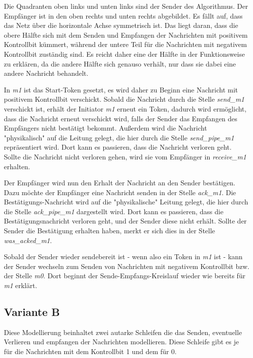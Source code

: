 \documentclass[]{scrartcl}
\begin{document}
Die Quadranten oben links und unten links sind der Sender des Algorithmus. Der Empfänger ist in den oben rechts und unten rechts abgebildet. Es fällt auf, dass das Netz über die horizontale Achse symmetrisch ist. Das liegt daran, dass die obere Hälfte sich mit dem Senden und Empfangen der Nachrichten mit positivem Kontrollbit kümmert, während der untere Teil für die Nachrichten mit negativem Kontrollbit zuständig sind. Es reicht daher eine der Hälfte in der Funktionsweise zu erklären, da die andere Hälfte sich genauso verhält, nur dass sie dabei eine andere Nachricht behandelt.

In \textit{m1} ist das Start-Token gesetzt, es wird daher zu Beginn eine Nachricht mit positivem Kontrollbit verschickt. Sobald die Nachricht durch die Stelle \textit{send\_m1} verschickt ist, erhält der Initiator \textit{m1} erneut ein Token, dadurch wird ermöglicht, dass die Nachricht erneut verschickt wird, falls der Sender das Empfangen des Empfängers nicht bestätigt bekommt. Außerdem wird die Nachricht "physikalisch" auf die Leitung gelegt, die hier durch die Stelle \textit{send\_pipe\_m1} repräsentiert wird. Dort kann es passieren, dass die Nachricht verloren geht. Sollte die Nachricht nicht verloren gehen, wird sie vom Empfänger in \textit{receive\_m1} erhalten.

Der Empfänger wird nun den Erhalt der Nachricht an den Sender bestätigen. Dazu möchte der Empfänger eine Nachricht senden in der Stelle \textit{ack\_m1}. Die Bestätigungs-Nachricht wird auf die "physikalische" Leitung gelegt, die hier durch die Stelle \textit{ack\_pipe\_m1} dargestellt wird. Dort kann es passieren, dass die Bestätigungsnachricht verloren geht, und der Sender diese nicht erhält. Sollte der Sender die Bestätigung erhalten haben, merkt er sich dies in der Stelle \textit{was\_acked\_m1}.

Sobald der Sender wieder sendebereit ist - wenn also ein Token in \textit{m1} ist - kann der Sender wechseln zum Senden von Nachrichten mit negativem Kontrollbit bzw. der Stelle \textit{m0}. Dort beginnt der Sende-Empfangs-Kreislauf wieder wie bereits für \textit{m1} erklärt.

\subsection{Variante B}
Diese Modellierung beinhaltet zwei autarke Schleifen die das Senden, eventuelle Verlieren und empfangen der Nachrichten modellieren. Diese Schleife gibt es je für die Nachrichten mit dem Kontrollbit 1 und dem für 0. 
\end{document}

